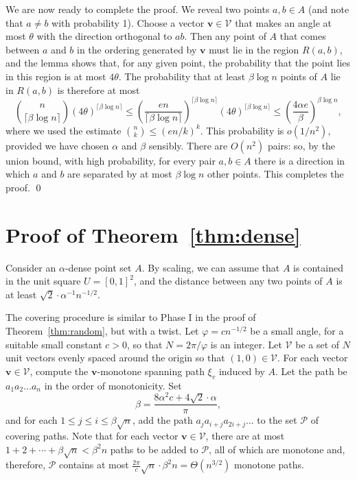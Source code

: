 \documentclass[a4paper,USenglish]{lipics-v2021}
\def\V{\mathcal V}
\begin{document}
We are now ready to complete the proof.  We reveal two points $a,b\in A$ (and note that $a\ne b$ with probability 1).
Choose a vector $\mathbf{v} \in \V$ that makes an angle at most $\theta$ with the direction orthogonal to $ab$.
Then any point of $A$ that comes between $a$ and $b$ in the ordering generated by $\mathbf{v}$ must 
lie in the region $R(a,b)$, and the lemma shows that, for any given point, the probability that the point lies in this region is at most $4\theta$.  The probability that at least $\beta\log n$ points of $A$ lie in $R(a,b)$ is therefore at most
\[
\binom{n}{\lceil \beta\log n\rceil}(4\theta)^{\lceil \beta\log n\rceil}
\le \left(\frac{en}{\lceil \beta\log n\rceil}\right)^{\lceil \beta\log n\rceil}(4\theta)^{\lceil \beta\log n\rceil}
\le \left(\frac{4\alpha e}{\beta}\right)^{\beta\log n},
\]
where we used the estimate $\binom n k\le(en/k)^k$.
This probability is $o(1/n^2)$, provided we have chosen $\alpha$ and $\beta$ sensibly.  There are $O(n^2)$ pairs: 
so, by the union bound, with high probability,  for every pair $a,b\in A$ there is a direction in which $a$ and $b$ 
are separated by at most $\beta\log n$ other points.  This completes the proof.
\qed




\section{Proof of Theorem~\ref{thm:dense}}

Consider an $\alpha$-dense point set $A$.
By scaling, we can assume that $A$ is contained in the unit square $U=[0,1]^2$,
and the distance between any two points of $A$ is at least $\sqrt{2} \cdot \alpha^{-1} n^{-1/2}$.

The covering procedure is similar to Phase I in the proof of Theorem~\ref{thm:random}, but with a twist.
Let $\varphi=c n^{-1/2}$ be a small angle, for a suitable small constant $c>0$, so that $N=2\pi/\varphi$ 
is an integer. Let $\V$ be a set of $N$ unit vectors evenly spaced around the origin so that 
$(1,0) \in \V$. For each vector $\mathbf{v} \in \V$, compute the $\mathbf{v}$-monotone spanning path
$\xi_v$ induced by $A$.
Let the path be $a_1a_2\ldots a_n$ in the order of monotonicity. Set 
\[ \beta=\frac{8 \alpha^2 c +4\sqrt{2} \cdot \alpha}{\pi}, \]
and for each $1\leq j \leq i \leq \beta\sqrt{n}$, 
add the path $a_ja_{i+j}a_{2i+j}\ldots$ to the set $\mathcal{P}$ of covering paths.
Note that for each vector $\mathbf{v} \in \V$, there are at most $1+2+\cdots+\beta\sqrt{n} < \beta^2n$
paths to be added to $\mathcal{P}$, all of which are monotone and, therefore, $\mathcal{P}$ contains 
at most $\frac{2\pi}{c} \sqrt{n} \cdot \beta^2n = \Theta(n^{3/2})$ monotone paths.
\end{document}
